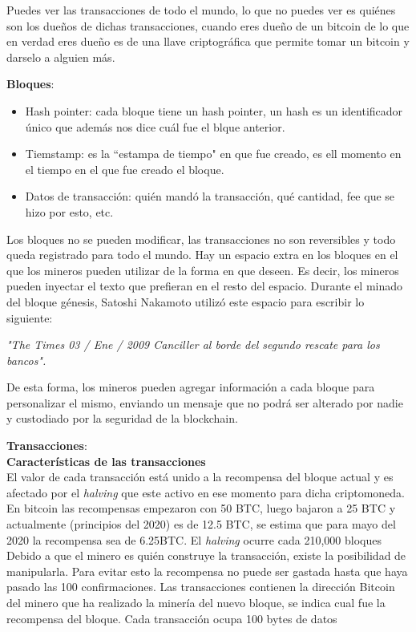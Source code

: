 \documentclass[a4paper,12pt]{/home/armando/Documentos/Cursos/LaTeX/Plantillas/lib/pub}
\begin{document}
Puedes ver las transacciones de todo el mundo, lo que no puedes ver es quiénes son los dueños de dichas transacciones, cuando eres dueño de un bitcoin de lo que en verdad eres dueño es de una llave criptográfica que permite tomar un bitcoin y darselo a alguien más.

\textbf{Bloques}:
\begin{itemize}
	\item Hash pointer: cada bloque tiene un hash pointer, un hash es un identificador único que además nos dice cuál fue el blque anterior.
	\item Tiemstamp: es la ``estampa de tiempo" en que fue creado, es ell momento en el tiempo en el que fue creado el bloque.
	\item Datos de transacción: quién mandó la transacción, qué cantidad, fee que se hizo por esto, etc.
\end{itemize}
Los bloques no se pueden modificar, las transacciones no son reversibles y todo queda registrado para todo el mundo. Hay un espacio extra en los bloques en el que los mineros pueden utilizar de la forma en que deseen. Es decir, los mineros pueden inyectar el texto que prefieran en el resto del espacio. Durante el minado del bloque génesis, Satoshi Nakamoto utilizó este espacio para escribir lo siguiente:

\textit{"The Times 03 / Ene / 2009 Canciller al borde del segundo rescate para los bancos".}

De esta forma, los mineros pueden agregar información a cada bloque para personalizar el mismo, enviando un mensaje que no podrá ser alterado por nadie y custodiado por la seguridad de la blockchain.

\textbf{Transacciones}:\\
\textbf{Características de las transacciones}\\
El valor de cada transacción está unido a la recompensa del bloque actual y es afectado por el \textit{halving} que este activo en ese momento para dicha criptomoneda. En bitcoin las recompensas empezaron con 50 BTC, luego bajaron a 25 BTC y actualmente (principios del 2020) es de 12.5 BTC, se estima que para mayo del 2020 la recompensa sea de 6.25BTC. El \textit{halving} ocurre cada 210,000 bloques Debido a que el minero es quién construye la transacción, existe la posibilidad de manipularla. Para evitar esto la recompensa no puede ser gastada hasta que haya pasado las 100 confirmaciones. Las transacciones contienen la dirección Bitcoin del minero que ha realizado la minería del nuevo bloque, se indica cual fue la recompensa del bloque. Cada transacción ocupa 100 bytes de datos
\end{document}
